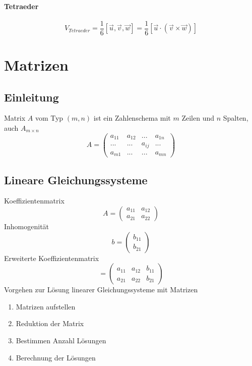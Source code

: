 \documentclass{report}
\begin{document}
\subsubsection{Tetraeder}
\begin{equation}V_{Tetraeder} = \frac{1}{6}[\vec{u}, \vec{v}, \vec{w}] = \frac{1}{6}[\vec{u} \cdot (\vec{v} \times \vec{w})]\end{equation}
\chapter{Matrizen}
\section{Einleitung}
Matrix $A$ vom Typ $(m,n)$ ist ein Zahlenschema mit $m$ Zeilen und $n$ Spalten, auch $A_{m \times n}$
\begin{equation}A = \left(\begin{matrix}a_{11} & a_{12} & ... & a_{1n}\\... & ... & a_{ij} & ...\\a_{m1} & ... & ... & a_{mn}\end{matrix}\right)\end{equation}
\section{Lineare Gleichungssysteme}
Koeffizientenmatrix
\begin{equation}A = \left(\begin{matrix}a_{11} & a_{12}\\a_{21} & a_{22}\end{matrix}\right)\end{equation}
Inhomogenität
\begin{equation}b = \left(\begin{matrix}b_{11} \\ b_{21}\end{matrix}\right)\end{equation}
Erweiterte Koeffizientenmatrix
\begin{equation}[A,b] = \left(\begin{matrix}a_{11} & a_{12} & b_{11}\\a_{21} & a_{22} & b_{21}\end{matrix}\right)\end{equation}
Vorgehen zur Lösung linearer Gleichungssysteme mit Matrizen
\begin{enumerate}\item Matrizen aufstellen
\item Reduktion der Matrix
\item Bestimmen Anzahl Lösungen
\item Berechnung der Lösungen\end{enumerate}
\end{document}
